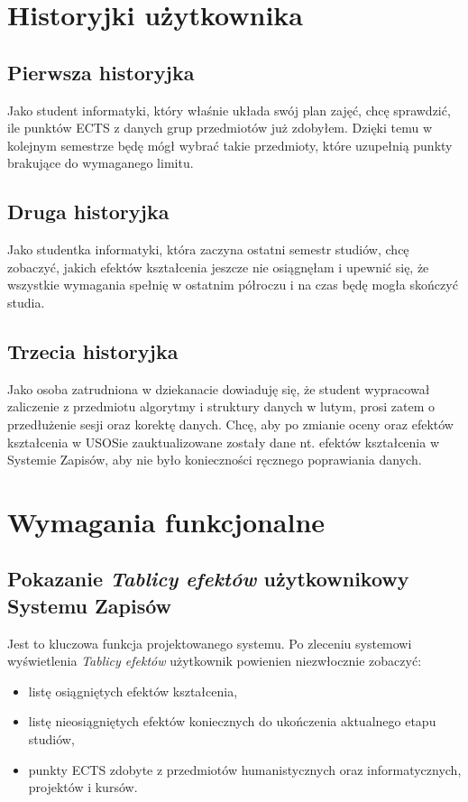 \documentclass{article}
\begin{document}
\section{Historyjki użytkownika}
\subsection{Pierwsza historyjka}
Jako student informatyki, który właśnie układa swój plan zajęć, chcę sprawdzić, ile punktów ECTS z danych grup przedmiotów już zdobyłem.
Dzięki temu w kolejnym semestrze będę mógł wybrać takie przedmioty, które uzupełnią punkty brakujące do wymaganego limitu.
\subsection{Druga historyjka}
Jako studentka informatyki, która zaczyna ostatni semestr studiów, chcę zobaczyć, jakich efektów kształcenia jeszcze nie osiągnęłam i upewnić się, że wszystkie wymagania spełnię w ostatnim półroczu i na czas będę mogła skończyć studia.
\subsection{Trzecia historyjka}
Jako osoba zatrudniona w dziekanacie dowiaduję się, że student wypracował zaliczenie z przedmiotu algorytmy i struktury danych w lutym, prosi zatem o przedłużenie sesji oraz korektę danych. 
Chcę, aby po zmianie oceny oraz efektów kształcenia w USOSie zauktualizowane zostały dane nt. efektów kształcenia w Systemie Zapisów, aby nie było konieczności ręcznego poprawiania danych.


\section{Wymagania funkcjonalne}

\subsection{Pokazanie \textit{Tablicy efektów} użytkownikowy Systemu Zapisów}
Jest to kluczowa funkcja projektowanego systemu.
Po zleceniu systemowi wyświetlenia \textit{Tablicy efektów} użytkownik powienien niezwłocznie zobaczyć:
\begin{itemize}
	\item listę osiągniętych efektów kształcenia,
	\item listę nieosiągniętych efektów koniecznych do ukończenia aktualnego etapu studiów,
	\item punkty ECTS zdobyte z przedmiotów humanistycznych oraz informatycznych, projektów i kursów.
\end{itemize}
\end{document}
